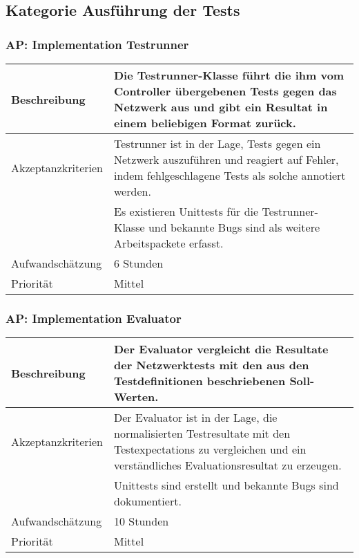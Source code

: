\documentclass[
	ngerman,
	toc=listof, %
	toc=bibliography, %
	footnotes=multiple, %
	parskip=half, %
	numbers=noendperiod %
]{scrartcl}
\begin{document}
	\subsection{Kategorie Ausführung der Tests}
	
	
	\subsubsection{AP: Implementation Testrunner}
	\begin{tabularx}{\textwidth}{lX}
		\toprule
		Beschreibung & Die Testrunner-Klasse führt die ihm vom Controller übergebenen Tests gegen das Netzwerk aus und gibt ein Resultat in einem beliebigen Format zurück.\\
		\midrule
		Akzeptanzkriterien & Testrunner ist in der Lage, Tests gegen ein Netzwerk auszuführen und reagiert auf Fehler, indem fehlgeschlagene Tests als solche annotiert werden.\\
		 & Es existieren Unittests für die Testrunner-Klasse und bekannte Bugs sind als weitere Arbeitspackete erfasst. \\
		\midrule
		Aufwandschätzung & 6 Stunden\\
		\midrule
		Priorität & Mittel \\
		\bottomrule
	\end{tabularx}

	\subsubsection{AP: Implementation Evaluator}
	\begin{tabularx}{\textwidth}{lX}
		\toprule
		Beschreibung & Der Evaluator vergleicht die Resultate der Netzwerktests mit den aus den Testdefinitionen beschriebenen Soll-Werten.\\
		\midrule
		Akzeptanzkriterien & Der Evaluator ist in der Lage, die normalisierten Testresultate mit den Testexpectations zu vergleichen und ein verständliches Evaluationsresultat zu erzeugen.\\
		 & Unittests sind erstellt und bekannte Bugs sind dokumentiert. \\
		\midrule
		Aufwandschätzung & 10 Stunden\\
		\midrule
		Priorität & Mittel \\
		\bottomrule
	\end{tabularx}
	\newpage
\end{document}
